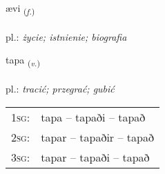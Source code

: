 \documentclass[frontgrid, backgrid]{flacards}\usepackage[]{graphicx}\usepackage[]{xcolor}
\begin{document}
\renewcommand{\flhead}{\vskip5pt \fboxsep=0pt {\small\bfseries\footnotesize Nafnorð | Noun}}
\renewcommand{\fcfoot}{\vskip5pt \fboxsep=0pt \hspace{2pt}{\small\bfseries\footnotesize 2K}}

\renewcommand{\blhead}{\vskip5pt {\small\bfseries\footnotesize Nafnorð | Noun }}
\renewcommand{\bcfoot}{\vskip5pt \hspace{2pt}{\small\bfseries\footnotesize 2K}}


{ævi \small{\textsubscript{(\textit{f.})}} \\[1ex] %
\textphonetic{[aiːvɪ]} \\
pl.: \emph{życie; istnienie; biografia} \\  [2ex]
\renewcommand*{\arraystretch}{0.8}
}

\renewcommand{\flhead}{\vskip5pt \fboxsep=0pt {\small\bfseries\footnotesize Sagnorð | Verb}}
\renewcommand{\fcfoot}{\vskip5pt \fboxsep=0pt \hspace{2pt}{\small\bfseries\footnotesize 2K}}

\renewcommand{\blhead}{\vskip5pt {\small\bfseries\footnotesize Sagnorð | Verb }}
\renewcommand{\bcfoot}{\vskip5pt \hspace{2pt}{\small\bfseries\footnotesize 2K}}


{tapa \small{\textsubscript{(\textit{v.})}} \\[1ex] %
\textphonetic{[tʰaːpa]} \\
pl.: \emph{tracić; przegrać; gubić} \\  [2ex]
\renewcommand*{\arraystretch}{0.8}
\begin{tabular}{p{1cm}l}
\textsc{1sg}: & tapa -- tapaði -- tapað \\ 
\textsc{2sg}: & tapar -- tapaðir -- tapað \\ 
\textsc{3sg}: & tapar -- tapaði -- tapað \\ 
\end{tabular}
}
\end{document}
